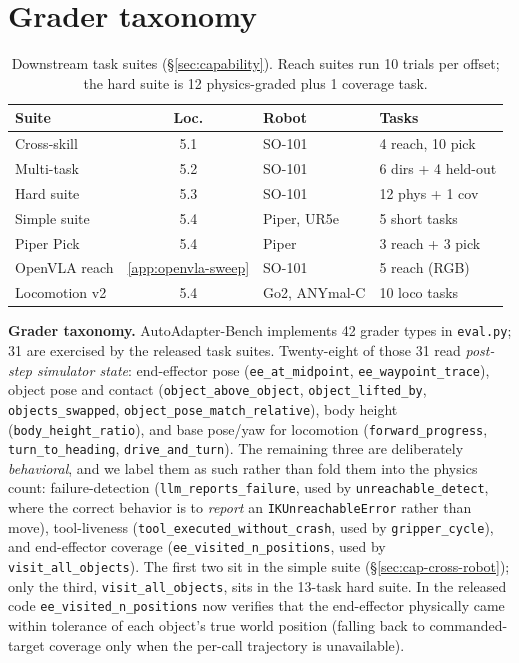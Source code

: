 \section{Grader taxonomy}
\label{app:graders}

\begin{table}[H]
\centering
\footnotesize
\setlength{\tabcolsep}{1.5pt}
\begin{tabular}{@{}lcll@{}}
\toprule
\textbf{Suite} & \textbf{Loc.} & \textbf{Robot} & \textbf{Tasks} \\
\midrule
Cross-skill       & 5.1 & SO-101       & 4 reach, 10 pick \\
Multi-task         & 5.2 & SO-101       & 6 dirs + 4 held-out \\
Hard suite        & 5.3 & SO-101       & 12 phys + 1 cov \\
Simple suite      & 5.4 & Piper, UR5e  & 5 short tasks \\
Piper Pick        & 5.4 & Piper        & 3 reach + 3 pick \\
OpenVLA reach     & \ref{app:openvla-sweep} & SO-101 & 5 reach (RGB) \\
Locomotion v2     & 5.4 & Go2, ANYmal-C & 10 loco tasks \\
\bottomrule
\end{tabular}
\caption{Downstream task suites (\S\ref{sec:capability}). Reach suites
run 10 trials per offset; the hard suite is 12 physics-graded plus 1
coverage task.}
\label{tab:suites}
\end{table}

\noindent\textbf{Grader taxonomy.} AutoAdapter-Bench implements 42
grader types in \texttt{eval.py}; 31 are exercised by the released
task suites. Twenty-eight of those 31 read \emph{post-step simulator
state}: end-effector pose (\texttt{ee\_at\_midpoint},
\texttt{ee\_waypoint\_trace}), object pose and contact
(\texttt{object\_above\_object}, \texttt{object\_lifted\_by},
\texttt{objects\_swapped}, \texttt{object\_pose\_match\_relative}),
body height (\texttt{body\_height\_ratio}), and base pose/yaw for
locomotion (\texttt{forward\_progress}, \texttt{turn\_to\_heading},
\texttt{drive\_and\_turn}). The remaining three are deliberately
\emph{behavioral}, and we label them as such rather than fold them
into the physics count: failure-detection
(\texttt{llm\_reports\_failure}, used by \texttt{unreachable\_detect},
where the correct behavior is to \emph{report} an
\texttt{IKUnreachableError} rather than move), tool-liveness
(\texttt{tool\_executed\_without\_crash}, used by
\texttt{gripper\_cycle}), and end-effector coverage
(\texttt{ee\_visited\_n\_positions}, used by
\texttt{visit\_all\_objects}). The first two sit in the simple suite
(\S\ref{sec:cap-cross-robot}); only the third,
\texttt{visit\_all\_objects}, sits in the 13-task hard suite. In the
released code \texttt{ee\_visited\_n\_positions} now verifies that the
end-effector physically came within tolerance of each object's true
world position (falling back to commanded-target coverage only when
the per-call trajectory is unavailable).

